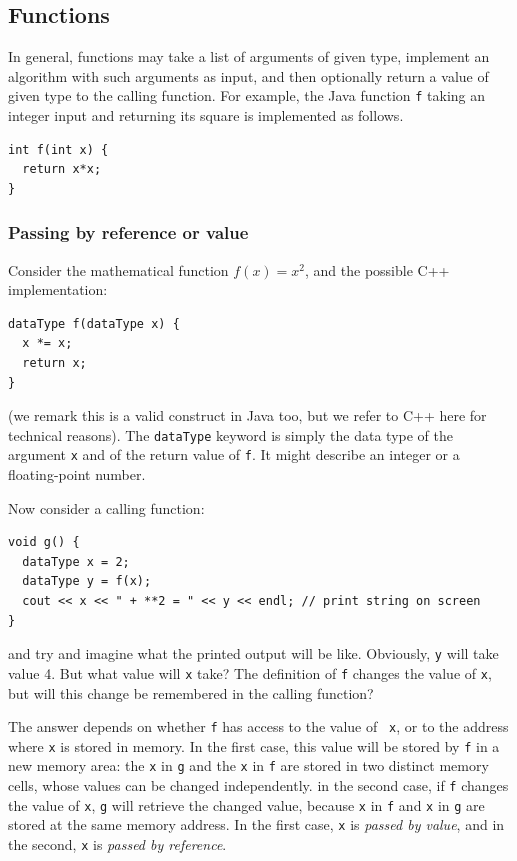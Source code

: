 \documentclass[a4paper]{book}
\theoremstyle{changebreak}                %
\begin{document}
\subsection{Functions}
In general, functions may take a list of
arguments of given type, implement an
algorithm with such arguments as input, and then
optionally return a value of given type to the calling function. For
example, the Java function {\tt f} taking an integer input and
returning its square is implemented as follows.
\begin{verbatim}
int f(int x) {
  return x*x;
}
\end{verbatim}

\subsubsection{Passing by reference or value} 
Consider the mathematical function $f(x)=x^2$, and the possible
C++ implementation:
\begin{verbatim}
dataType f(dataType x) {
  x *= x;
  return x;
}
\end{verbatim}
(we remark this is a valid construct in Java too, but we refer to C++
here for technical reasons). The {\tt dataType} keyword is simply the
data type of the argument {\tt x} and of the return value of {\tt f}. It might describe an integer
or a floating-point number.

Now consider a calling function:
\begin{verbatim}
void g() {
  dataType x = 2;
  dataType y = f(x);
  cout << x << " + **2 = " << y << endl; // print string on screen
}
\end{verbatim}
and try and imagine what the printed output will be like. Obviously,
{\tt y} will take value 4. But what value will {\tt x} take? The
definition of {\tt f} changes the value of {\tt x}, but will this
change be remembered in the calling function?

The answer depends on whether {\tt f} has access to the value of {\tt
  x}, or to the address where {\tt x} is stored in
memory. In the first case, this value will be stored by
{\tt f} in a new memory area: the {\tt x} in {\tt g} and the {\tt x}
in {\tt f} are stored in two distinct memory cells, whose values can
be changed independently. in the second case, if {\tt f} changes the
value of {\tt x}, {\tt g} will retrieve the changed value, because
{\tt x} in {\tt f} and {\tt x} in {\tt g} are stored at the same
memory address. In the first case, {\tt x} is {\it passed by
  value}, and in the
second, {\tt x} is {\it passed by reference}.
\end{document}
